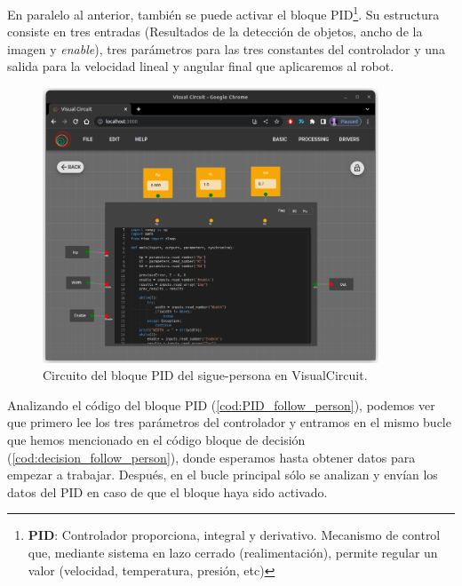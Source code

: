 En paralelo al anterior, también se puede activar el bloque PID\footnote{
    \textbf{PID}: Controlador proporciona, integral y derivativo.
        Mecanismo de control que, mediante sistema en lazo cerrado (realimentación), permite regular
        un valor (velocidad, temperatura, presión, etc)}.
Su estructura consiste en tres entradas (Resultados de la detección de objetos, ancho de la imagen y \textit{enable}), tres parámetros para las
tres constantes del controlador y una salida para la velocidad lineal y angular final que aplicaremos al robot.

\begin{figure} [H]
    \begin{center}
        \includegraphics[width=10cm]{figs/c5/PID_follow_person.png}
    \end{center}
    \caption[Circuito del bloque PID sigue-persona]{Circuito del bloque PID del sigue-persona en VisualCircuit.}
    \label{fig:initial_follow_person}
\end{figure}

Analizando el código del bloque PID (\ref{cod:PID_follow_person}), podemos ver que primero lee los tres parámetros del controlador y entramos en el
mismo bucle que hemos mencionado en el código bloque de decisión (\ref{cod:decision_follow_person}), donde esperamos hasta obtener datos para
empezar a trabajar. Después, en el bucle principal sólo se analizan y envían los datos del PID en caso de que el bloque haya sido activado.\\

